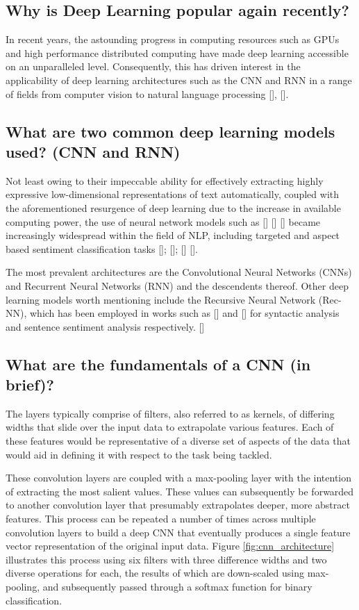 \documentclass[12pt, a4paper]{report}
\theoremstyle{definition}
\theoremstyle{definition}%
\theoremstyle{definition}%
\theoremstyle{definition}%
\theoremstyle{definition}%
\theoremstyle{definition}%
\renewcommand{\cite}[1]{[\citealp{#1}]}
\begin{document}
\subsection{Why is Deep Learning popular again recently?}
In recent years, the astounding progress in computing resources such as GPUs and high performance distributed computing have made deep learning accessible on an unparalleled level. Consequently, this has driven interest in the applicability of deep learning architectures such as the CNN and RNN in a range of fields from computer vision to natural language processing \cite{goldberg2015}, \cite{collobert2011}.

\subsection{What are two common deep learning models used? (CNN and RNN)}
Not least owing to their impeccable ability for effectively extracting highly expressive low-dimensional representations of text automatically, coupled with the aforementioned resurgence of deep learning due to the increase in available computing power, the use of neural network models such as \cite{lakkaraju2014} \cite{vo2015} \cite{nguyen2015}  became increasingly widespread within the field of NLP, including targeted and aspect based sentiment classification tasks \cite{dong}; \cite{wang}; \cite{tang2016} \cite{tang2016b}.

The most prevalent architectures are the Convolutional Neural Networks (CNNs) and Recurrent Neural Networks (RNN) and the descendents thereof. Other deep learning models worth mentioning include the Recursive Neural Network (Rec-NN), which has been employed in works such as \cite{socher2011} and \cite{socher2013} for syntactic analysis and sentence sentiment analysis respectively. \cite{zhang2018}

\subsection{What are the fundamentals of a CNN (in brief)?}
The layers typically comprise of filters, also referred to as kernels, of differing widths that slide over the input data to extrapolate various features. Each of these features would be representative of a diverse set of aspects of the data that would aid in defining it with respect to the task being tackled.  

These convolution layers are coupled with a max-pooling layer with the intention of extracting the most salient values. These values can subsequently be forwarded to another convolution layer that presumably extrapolates deeper, more abstract features. This process can be repeated a number of times across multiple convolution layers to build a deep CNN that eventually produces a single feature vector representation of the original input data. Figure \ref{fig:cnn_architecture} illustrates this process using six filters with three difference widths and two diverse operations for each, the results of which are down-scaled using max-pooling, and subsequently passed through a softmax function for binary classification. 
\end{document}
